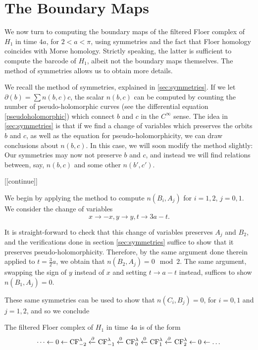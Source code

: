 \section{The Boundary Maps}

We now turn to computing the boundary maps of the filtered Floer complex of $H_1$ in time $4a$, for $2 < a < \pi$, using symmetries and the fact that Floer homology coincides with Morse homology. Strictly speaking, the latter is sufficient to compute the barcode of $H_1$, albeit not the boundary maps themselves. The method of symmetries allows us to obtain more details.

We recall the method of symmetries, explained in \ref{sec:symmetries}. If we let $\partial(b) = \sum n(b,c) c$, the scalar $n(b,c)$ can be computed by counting the number of pseudo-holomorphic curves (see the differential equation \eqref{pseudoholomorphic}) which connect $b$ and $c$ in the $C^\infty$ sense. The idea in \ref{sec:symmetries} is that if we find a change of variables which preserves the orbits $b$ and $c$, as well as the equation for pseudo-holomorphicity, we can draw conclusions about $n(b,c)$. In this case, we will soon modify the method slightly: Our symmetries may now not preserve $b$ and $c$, and instead we will find relations between, say, $n(b,c)$ and some other $n(b', c')$.

[[continue]]

We begin by applying the method to compute $n(B_i, A_j)$ for $i = 1, 2$, $j = 0, 1$. We consider the change of variables
\begin{equation}
x \to -x, y \to y, t \to 3a - t.
\end{equation}

It is straight-forward to check that this change of variables preserves $A_j$ and $B_2$, and the verifications done in section \ref{sec:symmetries} suffice to show that it preserves pseudo-holomorphicity. Therefore, by the same argument done therein applied to $t = \frac32 a$, we obtain that $n(B_2, A_j) = 0 \mod 2$. The same argument, swapping the sign of $y$ instead of $x$ and setting $t \to a - t$ instead, suffices to show $n(B_1, A_j) = 0$.

These same symmetries can be used to show that $n(C_i, B_j) = 0$, for $i = 0, 1$ and $j = 1, 2$, and so we conclude
\begin{prop}\label{fch14a1}
The filtered Floer complex of $H_1$ in time $4a$ is of the form
\begin{equation}
\dots \leftarrow 0 \leftarrow \mathrm{CF}_{-2}^\lambda \xleftarrow{\partial} \mathrm{CF}_{-1}^\lambda \xleftarrow{0} \mathrm{CF}_0^\lambda \xleftarrow{0} \mathrm{CF}_1^\lambda \xleftarrow{\partial} \mathrm{CF}_2^\lambda \leftarrow 0 \leftarrow \dots
\end{equation}
\end{prop}

